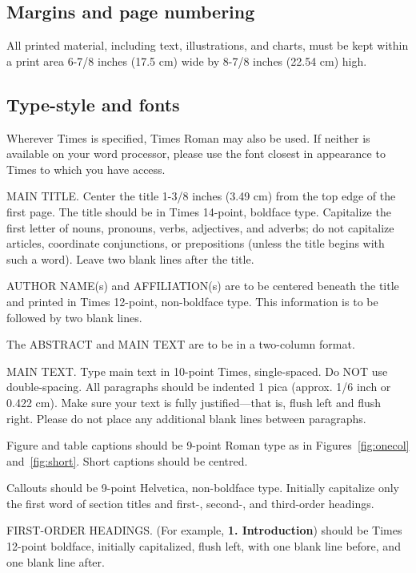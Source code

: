 \documentclass[10pt,twocolumn,letterpaper]{article}
\begin{document}
\subsection{Margins and page numbering}

All printed material, including text, illustrations, and charts, must
be kept within a print area 6-7/8 inches (17.5 cm) wide by 8-7/8
inches (22.54 cm) high.


\subsection{Type-style and fonts}

Wherever Times is specified, Times Roman may also be used. If neither
is available on your word processor, please use the font closest in
appearance to Times to which you have access.

MAIN TITLE. Center the title 1-3/8 inches (3.49 cm) from the top edge
of the first page. The title should be in Times 14-point, boldface
type.  Capitalize the first letter of nouns, pronouns, verbs,
adjectives, and adverbs; do not capitalize articles, coordinate
conjunctions, or prepositions (unless the title begins with such a
word). Leave two blank lines after the title.

AUTHOR NAME(s) and AFFILIATION(s) are to be centered beneath the title
and printed in Times 12-point, non-boldface type. This information is
to be followed by two blank lines.

The ABSTRACT and MAIN TEXT are to be in a two-column format.

MAIN TEXT. Type main text in 10-point Times, single-spaced. Do NOT use
double-spacing. All paragraphs should be indented 1 pica (approx. 1/6
inch or 0.422 cm). Make sure your text is fully justified---that is,
flush left and flush right. Please do not place any additional blank
lines between paragraphs.

Figure and table captions should be 9-point Roman type as in
Figures~\ref{fig:onecol} and~\ref{fig:short}.  Short captions should
be centred.

\noindent Callouts should be 9-point Helvetica, non-boldface type.
Initially capitalize only the first word of section titles and first-,
second-, and third-order headings.

FIRST-ORDER HEADINGS. (For example, {\large \bf 1. Introduction})
should be Times 12-point boldface, initially capitalized, flush left,
with one blank line before, and one blank line after.
\end{document}
